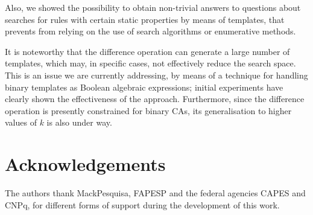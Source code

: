 \documentclass{llncs}
\begin{document}
Also, we showed the possibility to obtain non-trivial answers to questions about searches for rules with certain static properties by means of templates, that prevents from relying on the use of search algorithms or enumerative methods.

It is noteworthy that the difference operation can generate a large number of templates, which may, in specific cases, not effectively reduce the search space. This is an issue we are currently addressing, by means of a technique for handling binary templates as Boolean algebraic expressions; initial experiments have clearly shown the effectiveness of the approach. Furthermore, since the difference operation is presently constrained for binary CAs, its generalisation to higher values of $k$ is also under way.

\section*{Acknowledgements}
\label{sec:agrdecimentos}
The authors thank MackPesquisa, FAPESP and the federal agencies CAPES and CNPq, for different forms of support during the development of this work.
\end{document}
